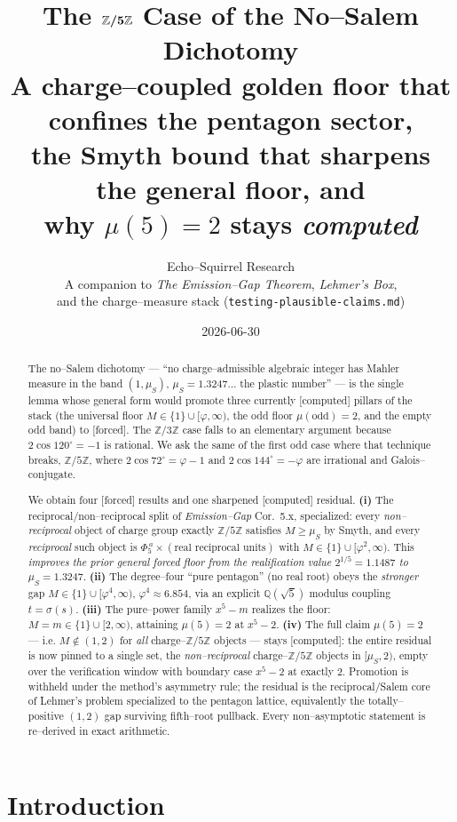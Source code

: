 \documentclass[11pt]{article}
\title{\textbf{The $\boldsymbol{\Zfive}$ Case of the No--Salem Dichotomy}\\[4pt]
\large A charge--coupled golden floor that confines the pentagon sector,\\
the Smyth bound that sharpens the general floor, and\\
why $\mu(5)=2$ stays \emph{computed}}
\author{Echo--Squirrel Research\\[2pt]
\small A companion to \emph{The Emission--Gap Theorem}, \emph{Lehmer's Box},\\
\small and the charge--measure stack (\texttt{testing-plausible-claims.md})}
\date{2026-06-30}
\newcommand{\forced}{\textcolor{cforced}{\textsf{[forced]}}}
\newcommand{\computed}{\textcolor{ccomp}{\textsf{[computed]}}}
\newcommand{\Z}{\mathbb{Z}}
\newcommand{\Q}{\mathbb{Q}}
\newcommand{\Mah}{M}
\newcommand{\muS}{\mu_S}
\newcommand{\Zfive}{\Z/5\Z}
\theoremstyle{plain}
\theoremstyle{definition}
\theoremstyle{remark}
\begin{document}
\maketitle

\begin{abstract}
\noindent
The no--Salem dichotomy --- ``no charge--admissible algebraic integer has Mahler measure in the
band $(1,\muS)$, $\muS=1.3247\ldots$ the plastic number'' --- is the single lemma whose general
form would promote three currently \computed{} pillars of the stack (the universal floor
$\Mah\in\{1\}\cup[\varphi,\infty)$, the odd floor $\mu(\text{odd})=2$, and the empty odd band)
to \forced{}. The $\Z/3\Z$ case falls to an elementary argument because $2\cos120^\circ=-1$ is
rational. We ask the same of the first odd case where that technique breaks, $\Zfive$, where
$2\cos72^\circ=\varphi-1$ and $2\cos144^\circ=-\varphi$ are irrational and Galois--conjugate.

We obtain four \forced{} results and one sharpened \computed{} residual.
\textbf{(i)} The reciprocal/non--reciprocal split of \emph{Emission--Gap} Cor.~5.x, specialized:
every \emph{non--reciprocal} object of charge group exactly $\Zfive$ satisfies $\Mah\ge\muS$ by
Smyth, and every \emph{reciprocal} such object is $\Phi_5^{\,a}\times(\text{real reciprocal units})$
with $\Mah\in\{1\}\cup[\varphi^2,\infty)$. This \emph{improves the prior general forced floor from
the realification value $2^{1/5}=1.1487$ to $\muS=1.3247$}. \textbf{(ii)} The degree--four ``pure
pentagon'' (no real root) obeys the \emph{stronger} gap $\Mah\in\{1\}\cup[\varphi^4,\infty)$,
$\varphi^4\approx6.854$, via an explicit $\Q(\sqrt5)$ modulus coupling $t=\sigma(s)$. \textbf{(iii)}
The pure--power family $x^5-m$ realizes the floor: $\Mah=m\in\{1\}\cup[2,\infty)$, attaining
$\mu(5)=2$ at $x^5-2$. \textbf{(iv)} The full claim $\mu(5)=2$ --- i.e. $\Mah\notin(1,2)$ for
\emph{all} charge--$\Zfive$ objects --- stays \computed{}: the entire residual is now pinned to a
single set, the \emph{non--reciprocal} charge--$\Zfive$ objects in $[\muS,2)$, empty over the
verification window with boundary case $x^5-2$ at exactly $2$. Promotion is withheld under the
method's asymmetry rule; the residual is the reciprocal/Salem core of Lehmer's problem specialized
to the pentagon lattice, equivalently the totally--positive $(1,2)$ gap surviving fifth--root
pullback. Every non--asymptotic statement is re--derived in exact arithmetic.
\end{abstract}

\section{Introduction}
\end{document}
